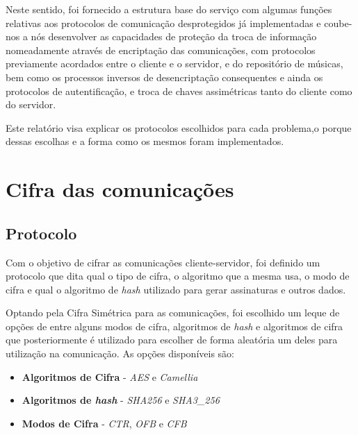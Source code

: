 \documentclass[10pt,english]{article}
\begin{document}
\par Neste sentido, foi fornecido a estrutura base do serviço com algumas funções relativas aos protocolos de comunicação desprotegidos já implementadas e coube-nos a nós desenvolver as capacidades de proteção da troca de informação nomeadamente através de encriptação das comunicações, com protocolos previamente acordados entre o cliente e o servidor, e do repositório de músicas, bem como os processos inversos de desencriptação consequentes e ainda os protocolos de autentificação, e troca de chaves assimétricas tanto do cliente como do servidor. 

\par Este relatório visa explicar os protocolos escolhidos para cada problema,o porque dessas escolhas e a forma como os mesmos foram implementados.
\clearpage

\section{Cifra das comunicações}
\subsection{Protocolo}
 \par Com o objetivo de cifrar as comunicações cliente-servidor, foi definido um protocolo que dita qual o tipo de cifra, o algoritmo que a mesma usa, o modo de cifra e qual o algoritmo de \textit{hash} utilizado para gerar assinaturas e outros dados.

\par Optando pela Cifra Simétrica para as comunicações, foi escolhido um leque de opções de entre alguns modos de cifra, algoritmos de \textit{hash} e algoritmos de cifra que posteriormente é utilizado para escolher de forma aleatória um deles para utilização na comunicação. As opções disponíveis são:

\begin{itemize}
    \item {\textbf{Algoritmos de Cifra}} - \textit{AES} e  \textit{Camellia}
   
   \item {\textbf{Algoritmos de \textit{hash}}} - \textit{SHA256} e \textit{SHA3\_256}
  
\item {\textbf{Modos de Cifra}} - \textit{CTR}, \textit{OFB} e \textit{CFB}
    
 \end{itemize}
 
\end{document}
